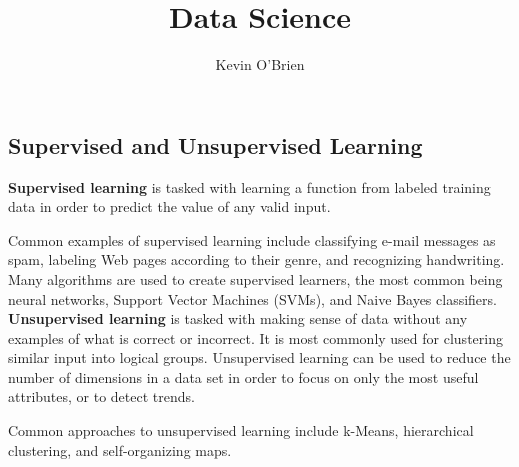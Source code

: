 \documentclass[12pt]{article}
\title{Data Science}
\author{Kevin O'Brien}
\begin{document}
	\large
\subsection*{Supervised and Unsupervised Learning}
\textbf{Supervised learning} is tasked with learning a function from labeled training data in order to predict the value of any valid input. 

Common examples of supervised learning include classifying e-mail messages as spam, labeling Web pages according to their genre, and recognizing handwriting. Many algorithms are used to create supervised learners, the most common being neural networks, Support Vector Machines (SVMs), and Naive Bayes classifiers.
\\
\textbf{Unsupervised learning} is tasked with making sense of data without any examples of what is correct or incorrect. It is most commonly used for clustering similar input into logical groups. Unsupervised learning  can be used to reduce the number of dimensions in a data set in order to focus on only the most useful attributes, or to detect trends. 

Common approaches to unsupervised learning include k-Means, hierarchical clustering, and self-organizing maps.
\end{document}
